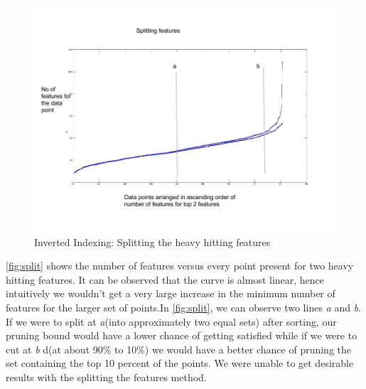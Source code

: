 \begin{figure}[ht]	
\centering
\includegraphics[width=1 \columnwidth]{img/feat_split.jpg}
\caption{Inverted Indexing: Splitting the heavy hitting features}
\label{fig:split}
\end{figure}

\autoref{fig:split} shows the number of features versus every point present for two heavy hitting features. It can be observed that the curve is almost linear, hence intuitively we wouldn't get a very large increase in the minimum number of features for the larger set of points.In \autoref{fig:split}, we can observe two lines \textit{a} and \textit{b}. If we were to split at \textit{a}(into approximately two equal sets) after sorting, our pruning bound would have a lower chance of getting  satisfied while if we were to cut at \textit{b} d(at about 90\% to 10\%) we would have a better chance of pruning the set containing the top 10 percent of the points. We were unable to get desirable results with the splitting the features method.